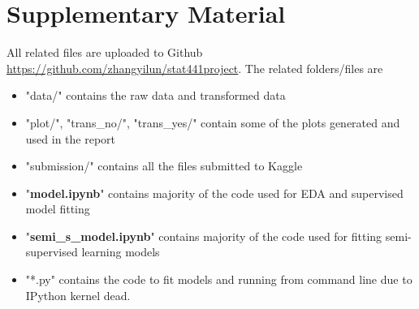 \documentclass[11pt]{article}
\begin{document}
\section{Supplementary Material}
All related files are uploaded to Github \href{https://github.com/zhangyilun/stat441project}{https://github.com/zhangyilun/stat441project}. The related folders/files are
\begin{itemize}
\item "data/" contains the raw data and transformed data
\item "plot/", "trans\_no/", "trans\_yes/" contain some of the plots generated and used in the report
\item "submission/" contains all the files submitted to Kaggle
\item "\textbf{model.ipynb}" contains majority of the code used for EDA and supervised model fitting
\item "\textbf{semi\_s\_model.ipynb}" contains majority of the code used for fitting semi-supervised learning models
\item "*.py" contains the code to fit models and running from command line due to IPython kernel dead.
\end{itemize}
\end{document}
